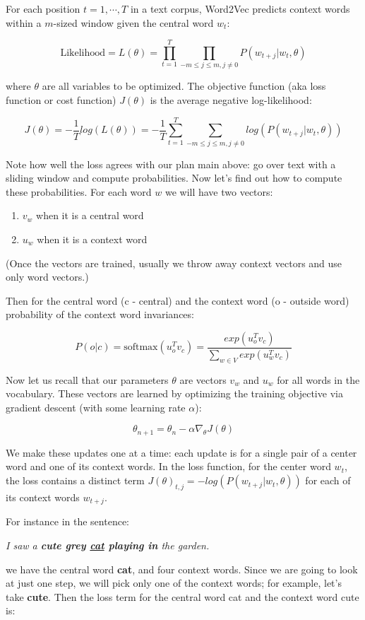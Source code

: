 \documentclass{report}
\begin{document}
For each position $t=1, \cdots, T$ in a text corpus, Word2Vec predicts context words within a $m$-sized window given the central word $w_t$:

$$\text{Likelihood} = L(\theta) = \prod_{t=1}^T \prod_{-m\le j \le m, j\neq 0} P(w_{t+j}|w_t, \theta)$$

where $\theta$ are all variables to be optimized. The objective function (aka loss function or cost function) $J(\theta)$ is the average negative log-likelihood:

$$J(\theta) = -\frac{1}{T}log(L(\theta)) = -\frac{1}{T}\sum_{t=1}^T \sum_{-m\le j \le m, j\neq 0} log(P(w_{t+j}|w_t, \theta))$$

Note how well the loss agrees with our plan main above: go over text with a sliding window and compute probabilities. Now let's find out how to compute these probabilities. For each word $w$ we will have two vectors:
\begin{enumerate}
	\item $v_w$ when it is a central word
	\item $u_w$ when it is a context word
\end{enumerate}
(Once the vectors are trained, usually we throw away context vectors and use only word vectors.)

Then for the central word (c - central) and the context word (o - outside word) probability of the context word invariances:

$$P(o|c) = \text{softmax}(u_o^T v_c) = \frac{exp(u_o^T v_c)}{\sum_{w\in V}exp(u_w^T v_c)}$$

Now let us recall that our parameters $\theta$ are vectors $v_w$ and $u_w$ for all words in the vocabulary. These vectors are learned by optimizing the training objective via gradient descent (with some learning rate $\alpha$):

$$\theta_{n+1} = \theta_{n} - \alpha \nabla_\theta J(\theta)$$

We make these updates one at a time: each update is for a single pair of a center word and one of its context words. In the loss function, for the center word $w_t$, the loss contains a distinct term $J(\theta)_{t,j}=-log(P(w_{t+j}|w_t, \theta))$ for each of its context words $w_{t+j}$.

For instance in the sentence: 

\textit{I saw a \textbf{cute grey \underline{cat} playing in} the garden.}

we have the central word \textbf{cat}, and four context words. Since we are going to look at just one step, we will pick only one of the context words; for example, let's take \textbf{cute}. Then the loss term for the central word cat and the context word cute is:
\end{document}
